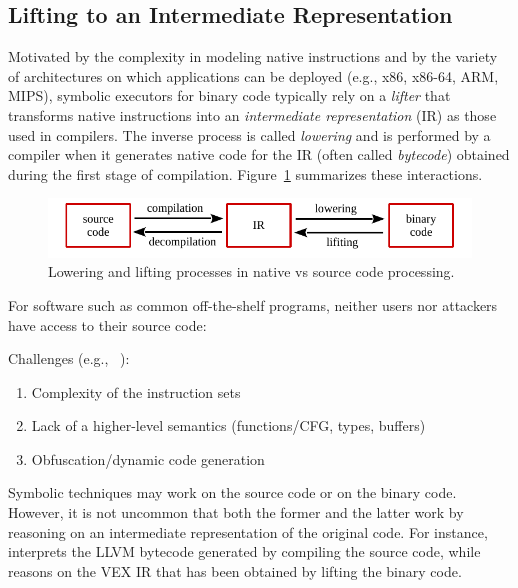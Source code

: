 \subsection{Lifting to an Intermediate Representation}
\missing
Motivated by the complexity in modeling native instructions and by the variety of architectures on which applications can be deployed (e.g., x86, x86-64, ARM, MIPS), symbolic executors for binary code typically rely on a {\em lifter} that transforms native instructions into an {\em intermediate representation} (IR) as those used in compilers. The inverse process is called {\em lowering} and is performed by a compiler when it generates native code for the IR (often called {\em bytecode}) obtained during the first stage of compilation. Figure~\ref{fig:lowering} summarizes these interactions.

\begin{figure}[h!]
  \centering
  \includegraphics[width=.7\columnwidth]{images/compiler}
  \caption{\label{fig:lowering} Lowering and lifting processes in native vs source code processing.}
\end{figure}

\vspace{2em}
 For software such as common off-the-shelf programs, neither users nor attackers have access to their source code: 

Challenges (e.g., ~\cite{BITBLAZE-ICISS08}):
\begin{enumerate}
\item Complexity of the instruction sets
\item Lack of a higher-level semantics (functions/CFG, types, buffers)
\item Obfuscation/dynamic code generation
\end{enumerate}

Symbolic techniques may work on the source code or on the binary code. However, it is not uncommon that both the former and the latter work by reasoning on an intermediate representation of the original code. For instance, ~\cite{KLEE-OSDI08} interprets the LLVM bytecode generated by compiling the source code, while~\cite{ANGR-SP16} reasons on the VEX IR that has been obtained by lifting the binary code.

